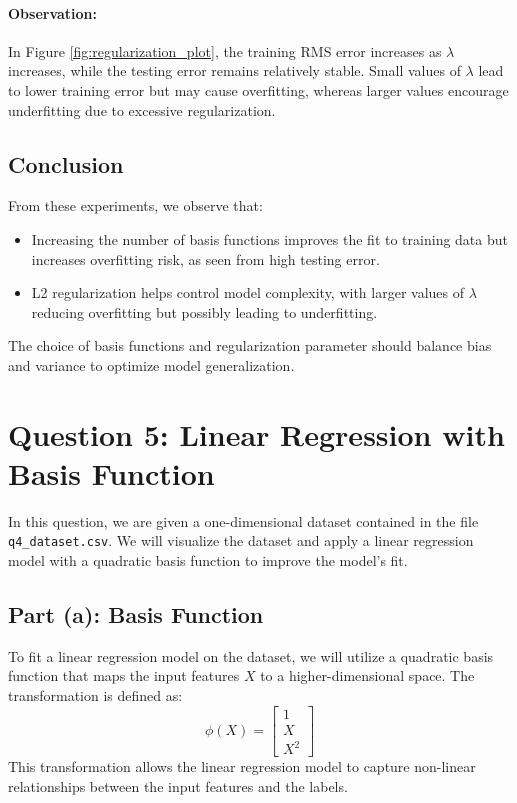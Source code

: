\documentclass{article}
\begin{document}
	\paragraph{Observation:}
	In Figure \ref{fig:regularization_plot}, the training RMS error increases as \(\lambda\) increases, while the testing error remains relatively stable. Small values of \(\lambda\) lead to lower training error but may cause overfitting, whereas larger values encourage underfitting due to excessive regularization.
	
	\subsection*{Conclusion}
	From these experiments, we observe that:
	\begin{itemize}
		\item Increasing the number of basis functions improves the fit to training data but increases overfitting risk, as seen from high testing error.
		\item L2 regularization helps control model complexity, with larger values of \(\lambda\) reducing overfitting but possibly leading to underfitting.
	\end{itemize}
	The choice of basis functions and regularization parameter should balance bias and variance to optimize model generalization.
	
	
	\section*{Question 5: Linear Regression with Basis Function}
	
	In this question, we are given a one-dimensional dataset contained in the file \texttt{q4\_dataset.csv}. We will visualize the dataset and apply a linear regression model with a quadratic basis function to improve the model's fit.
	
	\subsection*{Part (a): Basis Function}
	To fit a linear regression model on the dataset, we will utilize a quadratic basis function that maps the input features \( X \) to a higher-dimensional space. The transformation is defined as:
	\[
	\phi(X) = \begin{bmatrix}
		1 \\
		X \\
		X^2
	\end{bmatrix}
	\]
	This transformation allows the linear regression model to capture non-linear relationships between the input features and the labels.
	
\end{document}
